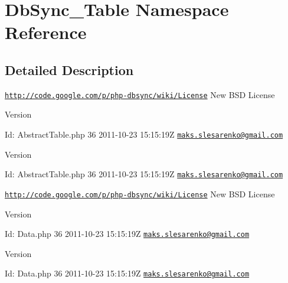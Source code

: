 \hypertarget{namespaceDbSync__Table}{
\section{DbSync\_\-Table Namespace Reference}
\label{namespaceDbSync__Table}
}


\subsection{Detailed Description}
\href{http://code.google.com/p/php-dbsync/wiki/License}{\tt http://code.google.com/p/php-\/dbsync/wiki/License} New BSD License \begin{DoxyVersion}{Version}

\end{DoxyVersion}
\begin{DoxyParagraph}{Id:}
AbstractTable.php 36 2011-\/10-\/23 15:15:19Z \href{mailto:maks.slesarenko@gmail.com}{\tt maks.slesarenko@gmail.com} 
\end{DoxyParagraph}


\begin{DoxyVersion}{Version}

\end{DoxyVersion}
\begin{DoxyParagraph}{Id:}
AbstractTable.php 36 2011-\/10-\/23 15:15:19Z \href{mailto:maks.slesarenko@gmail.com}{\tt maks.slesarenko@gmail.com} 
\end{DoxyParagraph}


\href{http://code.google.com/p/php-dbsync/wiki/License}{\tt http://code.google.com/p/php-\/dbsync/wiki/License} New BSD License \begin{DoxyVersion}{Version}

\end{DoxyVersion}
\begin{DoxyParagraph}{Id:}
Data.php 36 2011-\/10-\/23 15:15:19Z \href{mailto:maks.slesarenko@gmail.com}{\tt maks.slesarenko@gmail.com} 
\end{DoxyParagraph}


\begin{DoxyVersion}{Version}

\end{DoxyVersion}
\begin{DoxyParagraph}{Id:}
Data.php 36 2011-\/10-\/23 15:15:19Z \href{mailto:maks.slesarenko@gmail.com}{\tt maks.slesarenko@gmail.com} 
\end{DoxyParagraph}


